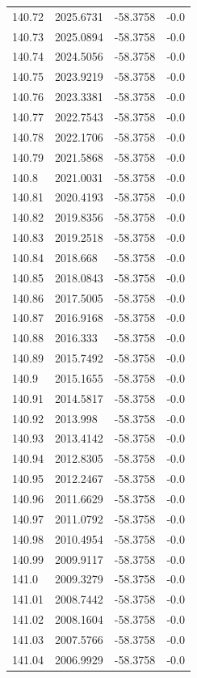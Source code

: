 \begin{table}[H]
\begin{tabular}{llll}
140.72 & 2025.6731 & -58.3758 & -0.0 \\
140.73 & 2025.0894 & -58.3758 & -0.0 \\
140.74 & 2024.5056 & -58.3758 & -0.0 \\
140.75 & 2023.9219 & -58.3758 & -0.0 \\
140.76 & 2023.3381 & -58.3758 & -0.0 \\
140.77 & 2022.7543 & -58.3758 & -0.0 \\
140.78 & 2022.1706 & -58.3758 & -0.0 \\
140.79 & 2021.5868 & -58.3758 & -0.0 \\
140.8 & 2021.0031 & -58.3758 & -0.0 \\
140.81 & 2020.4193 & -58.3758 & -0.0 \\
140.82 & 2019.8356 & -58.3758 & -0.0 \\
140.83 & 2019.2518 & -58.3758 & -0.0 \\
140.84 & 2018.668 & -58.3758 & -0.0 \\
140.85 & 2018.0843 & -58.3758 & -0.0 \\
140.86 & 2017.5005 & -58.3758 & -0.0 \\
140.87 & 2016.9168 & -58.3758 & -0.0 \\
140.88 & 2016.333 & -58.3758 & -0.0 \\
140.89 & 2015.7492 & -58.3758 & -0.0 \\
140.9 & 2015.1655 & -58.3758 & -0.0 \\
140.91 & 2014.5817 & -58.3758 & -0.0 \\
140.92 & 2013.998 & -58.3758 & -0.0 \\
140.93 & 2013.4142 & -58.3758 & -0.0 \\
140.94 & 2012.8305 & -58.3758 & -0.0 \\
140.95 & 2012.2467 & -58.3758 & -0.0 \\
140.96 & 2011.6629 & -58.3758 & -0.0 \\
140.97 & 2011.0792 & -58.3758 & -0.0 \\
140.98 & 2010.4954 & -58.3758 & -0.0 \\
140.99 & 2009.9117 & -58.3758 & -0.0 \\
141.0 & 2009.3279 & -58.3758 & -0.0 \\
141.01 & 2008.7442 & -58.3758 & -0.0 \\
141.02 & 2008.1604 & -58.3758 & -0.0 \\
141.03 & 2007.5766 & -58.3758 & -0.0 \\
141.04 & 2006.9929 & -58.3758 & -0.0 \\

\end{tabular}
\end{table}
